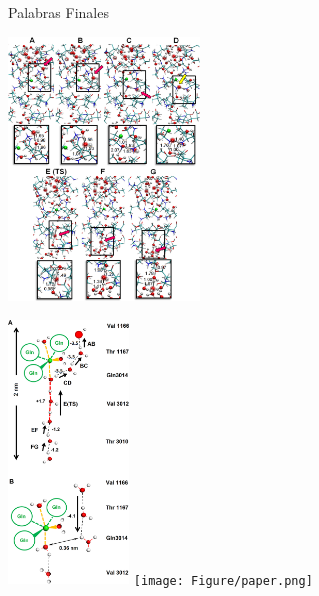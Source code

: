 \documentclass[8pt]{beamer}
\begin{document}
\begin{frame}[t]{Palabras Finales}
\hspace{-0.8cm}
\begin{minipage}[t]{0.5\textwidth}
\centering
\includegraphics[height=7cm]{Figure/grothuss.png}
\end{minipage}
\begin{minipage}[t]{0.5\textwidth}
\centering
\includegraphics[height=7cm]{Figure/grothuss_2.png}
\texttt{[image: Figure/paper.png]}
\end{minipage}
\end{frame}
\end{document}
